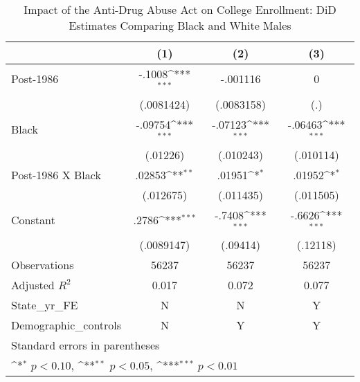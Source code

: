 \begin{table}[htbp]\centering
\def\sym#1{\ifmmode^{#1}\else\(^{#1}\)\fi}
\caption{Impact of the Anti-Drug Abuse Act on College Enrollment: DiD Estimates Comparing Black and White Males}
\begin{tabular}{l*{3}{c}}
\hline\hline
                    &\multicolumn{1}{c}{(1)}         &\multicolumn{1}{c}{(2)}         &\multicolumn{1}{c}{(3)}         \\
\hline
Post-1986           &      -.1008\sym{***}&    -.001116         &           0         \\
                    &  (.0081424)         &  (.0083158)         &         (.)         \\
[1em]
Black               &     -.09754\sym{***}&     -.07123\sym{***}&     -.06463\sym{***}\\
                    &    (.01226)         &   (.010243)         &   (.010114)         \\
[1em]
Post-1986 X Black   &      .02853\sym{**} &      .01951\sym{*}  &      .01952\sym{*}  \\
                    &   (.012675)         &   (.011435)         &   (.011505)         \\
[1em]
Constant            &       .2786\sym{***}&      -.7408\sym{***}&      -.6626\sym{***}\\
                    &  (.0089147)         &    (.09414)         &    (.12118)         \\
\hline
Observations        &       56237         &       56237         &       56237         \\
Adjusted \(R^{2}\)  &       0.017         &       0.072         &       0.077         \\
State\_yr\_FE         &           N         &           N         &           Y         \\
Demographic\_controls&           N         &           Y         &           Y         \\
\hline\hline
\multicolumn{4}{l}{\footnotesize Standard errors in parentheses}\\
\multicolumn{4}{l}{\footnotesize \sym{*} \(p<0.10\), \sym{**} \(p<0.05\), \sym{***} \(p<0.01\)}\\
\end{tabular}
\end{table}
